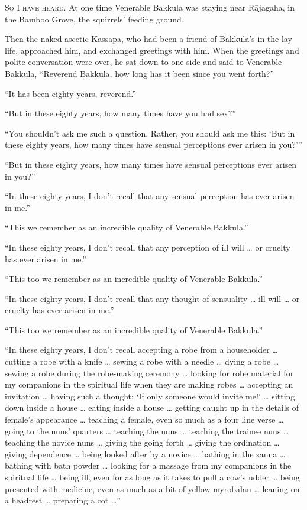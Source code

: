 \documentclass[12pt,openany]{book}%
\newcommand*{\scevam}[1]{\textsc{#1}}
\begin{document}
\scevam{So I have heard. }At one time Venerable Bakkula was staying near \textsanskrit{Rājagaha}, in the Bamboo Grove, the squirrels’ feeding ground. 

Then the naked ascetic Kassapa, who had been a friend of Bakkula’s in the lay life, approached him, and exchanged greetings with him. When the greetings and polite conversation were over, he sat down to one side and said to Venerable Bakkula, “Reverend Bakkula, how long has it been since you went forth?” 

“It has been eighty years, reverend.” 

“But in these eighty years, how many times have you had sex?” 

“You shouldn’t ask me such a question. Rather, you should ask me this: ‘But in these eighty years, how many times have sensual perceptions ever arisen in you?’” 

“But in these eighty years, how many times have sensual perceptions ever arisen in you?” 

“In these eighty years, I don’t recall that any sensual perception has ever arisen in me.” 

“This we remember as an incredible quality of Venerable Bakkula.” 

“In these eighty years, I don’t recall that any perception of ill will … or cruelty has ever arisen in me.” 

“This too we remember as an incredible quality of Venerable Bakkula.” 

“In these eighty years, I don’t recall that any thought of sensuality … ill will … or cruelty has ever arisen in me.” 

“This too we remember as an incredible quality of Venerable Bakkula.” 

“In these eighty years, I don’t recall accepting a robe from a householder … cutting a robe with a knife … sewing a robe with a needle … dying a robe … sewing a robe during the robe-making ceremony … looking for robe material for my companions in the spiritual life when they are making robes … accepting an invitation … having such a thought: ‘If only someone would invite me!’ … sitting down inside a house … eating inside a house … getting caught up in the details of female’s appearance … teaching a female, even so much as a four line verse … going to the nuns’ quarters … teaching the nuns … teaching the trainee nuns … teaching the novice nuns … giving the going forth … giving the ordination … giving dependence … being looked after by a novice … bathing in the sauna … bathing with bath powder … looking for a massage from my companions in the spiritual life … being ill, even for as long as it takes to pull a cow’s udder … being presented with medicine, even as much as a bit of yellow myrobalan … leaning on a headrest … preparing a cot …” 
\end{document}

